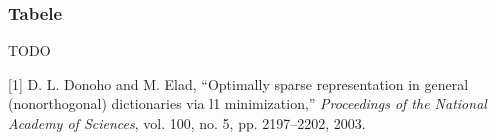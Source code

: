 \documentclass[]{article}
\begin{document}
\subsubsection{Tabele}\label{tabele}

TODO

\hypertarget{refs}{}
\hypertarget{ref-OptimSpReprDonoho2003}{}
{[}1{]} D. L. Donoho and M. Elad, ``Optimally sparse representation in
general (nonorthogonal) dictionaries via l1 minimization,''
\emph{Proceedings of the National Academy of Sciences}, vol. 100, no. 5,
pp. 2197--2202, 2003.
\end{document}
